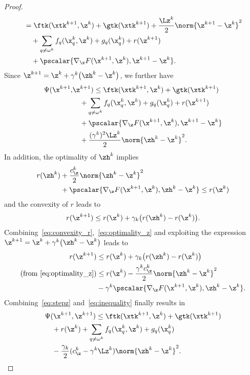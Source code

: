 \begin{proof}
\begin{align}
    & = \ftk(\xtk^{k+1},\z^{k}) + \gtk(\xtk^{k+1}) + \frac{\Lz^k}{2} \norm{\z^{k+1} - \z^k}^2 \nonumber \\
    & \quad + \sum_{q \neq \omega^k} f_q(\x_q^{k},\z^k) + g_q(\x_q^{k}) + r(\z^{k+1})  \nonumber \\
    & \quad + \pscalar{\nabla_{\z} F(\x^{k+1},\z^k), \z^{k+1} - \z^k}.
\end{align}
%
Since $\z^{k+1} = \z^k + \gamma^k \bigl( \zh^k - \z^k  \bigr)$, we further have
%
\begin{align} \label{eq:inequality}
\Psi(\x^{k+1},& \z^{k+1}) \leq \ftk(\xtk^{k+1},\z^{k}) + \gtk(\xtk^{k+1}) \nonumber \\
& \quad + \sum_{q \neq \omega^k} f_q(\x_q^{k},\z^k) + g_q(\x_q^{k}) + r(\z^{k+1})  \nonumber \\
& \quad + \pscalar{\nabla_{\z} F(\x^{k+1},\z^k), \z^{k+1} - \z^k} \nonumber \\
& \quad + \frac{(\gamma^k)^2\Lz^k}{2} \norm{\zh^{k} - \z^k}^2.
\end{align}
%
In addition, the optimality of $\zh^k$ implies
%
\begin{equation} \label{eq:optimality_z}
\begin{split}
r(\zh^k) &+ \frac{c_{\z}^k}{2} \norm{\zh^k - \z^k}^2 \\
& + \pscalar{\nabla_{\z} F(\x^{k+1},\z^k), \zh^k - \z^k}  \leq r(\z^k)
\end{split}
\end{equation}
%
and the convexity of $r$ leads to
%
\begin{equation} \label{eq:convexity_r}
r(\z^{k+1}) \leq r(\z^k) + \gamma_k \bigl( r(\zh^k) -  r(\z^k) \bigr).
\end{equation}
%
Combining~\eqref{eq:convexity_r},~\eqref{eq:optimality_z} and exploiting the expression $\z^{k+1} = \z^k + \gamma^k \bigl( \zh^k - \z^k  \bigr)$ leads to
%
\begin{align}
    r(\z^{k+1}) &\leq r(\z^k) + \gamma_k \bigl( r(\zh^k) -  r(\z^k) \bigr) \nonumber \\
    \text{(from \eqref{eq:optimality_z})} & \leq r(\z^k) - \frac{\gamma^k c_{\z}^k}{2} \norm{\zh^{k} - \z^k}^2 \nonumber \\
    & - \gamma^k \pscalar{\nabla_{\z} F(\x^{k+1},\z^k), \zh^k - \z^k}. \label{eq:stepz}
\end{align}
%
Combining~\eqref{eq:stepz} and~\eqref{eq:inequality} finally results in
%
\begin{align} \label{eq:sufficient_decrease_z}
    &\Psi(\x^{k+1},\z^{k+1}) \leq \ftk(\xtk^{k+1},\z^{k}) + \gtk(\xtk^{k+1}) \nonumber \\
    & \quad + r(\z^{k}) + \sum_{q \neq \omega^k} f_q(\x_q^{k},\z^k) + g_q(\x_q^{k}) \nonumber \\
    & \quad - \frac{\gamma_k}{2} (c_{\z}^k - \gamma^k \Lz^k) \norm{\zh^{k} - \z^k}^2.
\end{align}


\end{proof}
